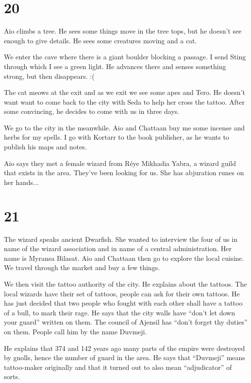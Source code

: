 \documentclass[10pt,a4paper,twoside,openany,hidelinks]{book}
\begin{document}
\chapter*{20}

Aio climbs a tree. He sees some things move in the tree tops, but he doesn't see enough to give details. He sees some creatures moving and a cat.

We enter the cave where there is a giant boulder blocking a passage. I send Sting through which I see a green light. He advances there and senses something strong, but then disappears. :(

The cat meows at the exit and as we exit we see some apes and Tero. He doesn't want want to come back to the city with Seda to help her cross the tattoo. After some convincing, he decides to come with us in three days.

We go to the city in the meanwhile. Aio and Chattaan buy me some incense and herbs for my spells. I go with Kortarr to the book publisher, as he wants to publish his maps and notes.

Aio says they met a female wizard from Réye Mikhadia Yabra, a wizard guild that exists in the area. They've been looking for us. She has abjuration runes on her hands...

\chapter*{21}

The wizard speaks ancient Dwarfish. She wanted to interview the four of us in name of the wizard association and in name of a central administration. Her name is Myransa Bilasat.
Aio and Chattaan then go to explore the local cuisine.
We travel through the market and buy a few things.

We then visit the tattoo authority of the city. He explains about the tattoos. The local wizards have their set of tattoos, people can ask for their own tattoos. He has just decided that two people who fought with each other shall have a tattoo of a bull, to mark their rage.
He says that the city walls have ``don't let down your guard'' written on them. The council of Ajensil has ``don't forget thy duties'' on them. People call him by the name Duvmeji.

He explains that 374 and 142 years ago many parts of the empire were destroyed by gnolls, hence the number of guard in the area. He says that ``Duvmeji'' means tattoo-maker originally and that it turned out to also mean ``adjudicator'' of sorts.
\end{document}
